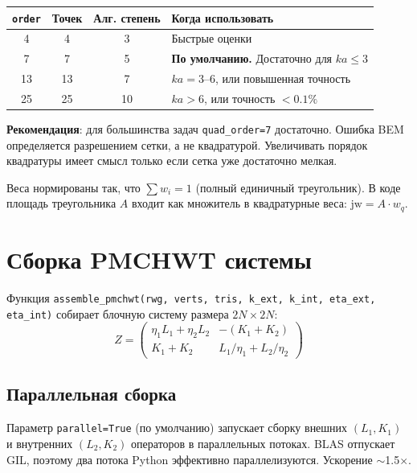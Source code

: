 \documentclass[12pt,a4paper]{article}
\begin{document}
\begin{center}
\begin{tabular}{cccl}
\toprule
\texttt{order} & Точек & Алг. степень & Когда использовать \\
\midrule
4 & 4 & 3 & Быстрые оценки \\
7 & 7 & 5 & \textbf{По умолчанию.} Достаточно для $ka \leq 3$ \\
13 & 13 & 7 & $ka = 3$--6, или повышенная точность \\
25 & 25 & 10 & $ka > 6$, или точность $< 0.1\%$ \\
\bottomrule
\end{tabular}
\end{center}

\textbf{Рекомендация}: для большинства задач \texttt{quad\_order=7} достаточно. Ошибка BEM определяется разрешением сетки, а не квадратурой. Увеличивать порядок квадратуры имеет смысл только если сетка уже достаточно мелкая.

Веса нормированы так, что $\sum w_i = 1$ (полный единичный треугольник). В коде площадь треугольника $A$ входит как множитель в квадратурные веса: $\mathrm{jw} = A \cdot w_q$.


\section{Сборка PMCHWT системы}

Функция \texttt{assemble\_pmchwt(rwg, verts, tris, k\_ext, k\_int, eta\_ext, eta\_int)} собирает блочную систему размера $2N \times 2N$:
\begin{equation}
  Z = \begin{pmatrix}
    \eta_1 L_1 + \eta_2 L_2 & -(K_1 + K_2) \\
    K_1 + K_2 & L_1/\eta_1 + L_2/\eta_2
  \end{pmatrix}
\end{equation}

\subsection{Параллельная сборка}

Параметр \texttt{parallel=True} (по умолчанию) запускает сборку внешних $(L_1, K_1)$ и внутренних $(L_2, K_2)$ операторов в параллельных потоках. BLAS отпускает GIL, поэтому два потока Python эффективно параллелизуются. Ускорение $\sim$1.5$\times$.
\end{document}
